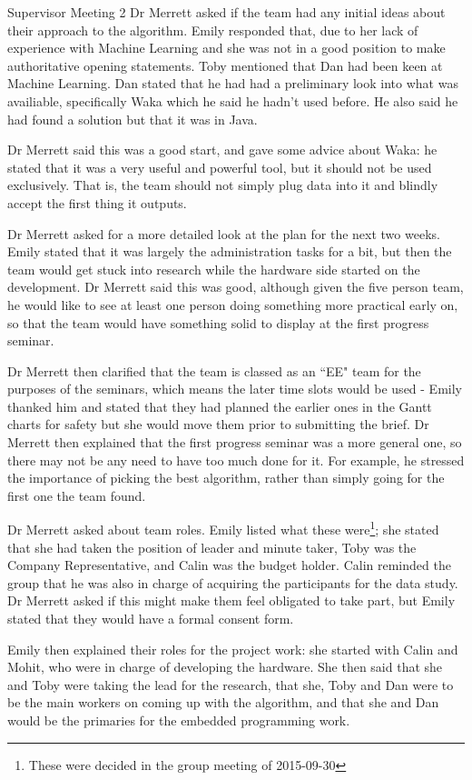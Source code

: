 \documentclass{article}
\begin{document}
\begin{Minutes}{Supervisor Meeting 2}
Dr Merrett asked if the team had any initial ideas about their approach to the algorithm. Emily
responded that, due to her lack of experience with Machine Learning and she was not in a good
position to make authoritative opening statements. Toby mentioned that Dan had been keen at
Machine Learning. Dan stated that he had had a preliminary look into what was availiable,
specifically Waka which he said he hadn't used before. He also said he had found a solution
but that it was in Java.

Dr Merrett said this was a good start, and gave some advice about Waka: he stated that it was
a very useful and powerful tool, but it should not be used exclusively. That is, the team should
not simply plug data into it and blindly accept the first thing it outputs.

Dr Merrett asked for a more detailed look at the plan for the next two weeks. Emily stated that
it was largely the administration tasks for a bit, but then the team would get stuck into
research while the hardware side started on the development. Dr Merrett said this was good,
although given the five person team, he would like to see at least one person doing something
more practical early on, so that the team would have something solid to display at the first
progress seminar.

Dr Merrett then clarified that the team is classed as an ``EE" team for the purposes of the
seminars, which means the later time slots would be used - Emily thanked him and stated that
they had planned the earlier ones in the Gantt charts for safety but she would move them
prior to submitting the brief. Dr Merrett then explained that the first progress seminar was
a more general one, so there may not be any need to have too much done for it. For example,
he stressed the importance of picking the best algorithm, rather than simply going for the
first one the team found.

Dr Merrett asked about team roles. Emily listed what these were\footnote
{These were decided in the group meeting of 2015-09-30}; she stated that she had taken the
position of leader and minute taker, Toby was the Company Representative, and Calin was the
budget holder. Calin reminded the group that he was also in charge of acquiring the participants
for the data study. Dr Merrett asked if this might make them feel obligated to take part, but
Emily stated that they would have a formal consent form.

Emily then explained their roles for the project work: she started with Calin and Mohit, who
were in charge of developing the hardware. She then said that she and Toby were taking the
lead for the research, that she, Toby and Dan were to be the main workers on coming up with
the algorithm, and that she and Dan would be the primaries for the embedded programming work.


\end{Minutes}
\end{document}
